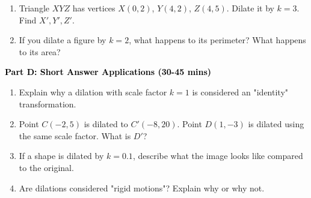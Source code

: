 \documentclass[12pt, letterpaper, fleqn]{article}
\begin{document}
\begin{enumerate}[itemsep=4.2cm, leftmargin=0.6cm, resume]
\item Triangle $XYZ$ has vertices $X(0, 2)$, $Y(4, 2)$, $Z(4, 5)$. Dilate it by $k=3$. Find $X', Y', Z'$.
\item If you dilate a figure by $k=2$, what happens to its perimeter? What happens to its area?
\end{enumerate}

\newpage

\begin{tcolorbox}[colback=customteal!20]
\large\textcolor{black}{\textbf{Part D: Short Answer Applications (30-45 mins)}}
\end{tcolorbox}

\vspace{3mm}

\begin{enumerate}[itemsep=4.2cm, leftmargin=0.6cm, resume]
\item Explain why a dilation with scale factor $k=1$ is considered an "identity" transformation.
\item Point $C(-2, 5)$ is dilated to $C'(-8, 20)$. Point $D(1, -3)$ is dilated using the same scale factor. What is $D'$?
\item If a shape is dilated by $k=0.1$, describe what the image looks like compared to the original.
\item Are dilations considered "rigid motions"? Explain why or why not.
\end{enumerate}
\end{document}
